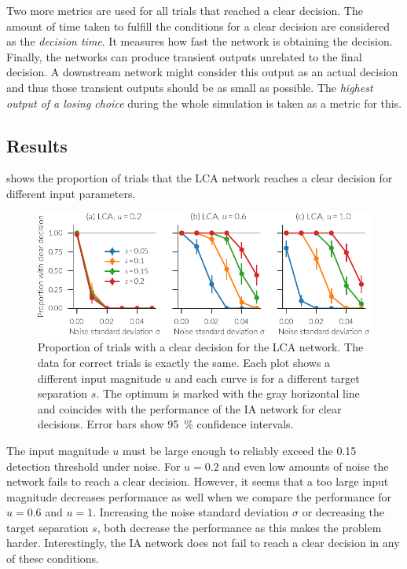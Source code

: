 Two more metrics are used for all trials that reached a clear decision.
The amount of time taken to fulfill the conditions for a clear decision are considered as the \emph{decision time}.
It measures how fast the network is obtaining the decision.
Finally, the networks can produce transient outputs unrelated to the final decision.
A downstream network might consider this output as an actual decision and thus those transient outputs should be as small as possible.
The \emph{highest output of a losing choice} during the whole simulation is taken as a metric for this.


\subsection{Results}
 shows the proportion of trials that the LCA network reaches a clear decision for different input parameters.
\begin{figure}
    \centering
    \includegraphics[trim=0 4 0 0]{figures/ia-clear}
    \caption[Proportion of trials with a clear decision for the LCA network.]{Proportion of trials with a clear decision for the LCA network. The data for correct trials is exactly the same. Each plot shows a different input magnitude $u$ and each curve is for a different target separation $s$. The optimum is marked with the gray horizontal line and coincides with the performance of the IA network for clear decisions. Error bars show \SI{95}{\percent} confidence intervals.}\label{fig:ia-clear}
\end{figure}
The input magnitude $u$ must be large enough to reliably exceed the \num{0.15} detection threshold under noise.
For $u = 0.2$ and even low amounts of noise the network fails to reach a clear decision.
However, it seems that a too large input magnitude decreases performance as well when we compare the performance for $u=0.6$ and $u=1$.
Increasing the noise standard deviation $\sigma$ or decreasing the target separation $s$, both decrease the performance as this makes the problem harder.
Interestingly, the IA network does not fail to reach a clear decision in any of these conditions.

